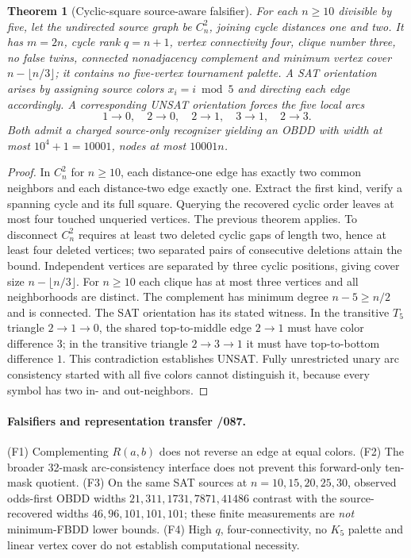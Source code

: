 \documentclass[11pt]{article}
\newtheorem{theorem}{Theorem}
\begin{document}
\begin{theorem}[Cyclic-square source-aware falsifier]
For each $n\ge10$ divisible by five, let the undirected source
graph be $C_n^2$, joining cycle distances one and two. It has
$m=2n$, cycle rank $q=n+1$, vertex connectivity four, clique number
three, no false twins, connected nonadjacency complement and minimum
vertex cover $n-\lfloor n/3\rfloor$; it contains no five-vertex
tournament palette. A SAT orientation arises by assigning source
colors $x_i=i\bmod5$ and directing each edge accordingly. A
corresponding UNSAT orientation forces the five local arcs
\[
1\to0,\quad2\to0,\quad2\to1,\quad3\to1,\quad2\to3.
\]
Both admit a charged source-only recognizer yielding an OBDD with
width at most $10^4+1=10001$, nodes at most $10001n$.
\end{theorem}
\begin{proof}
In $C_n^2$ for $n\ge10$, each distance-one edge has exactly two
common neighbors and each distance-two edge exactly one. Extract
the first kind, verify a spanning cycle and its full square.
Querying the recovered cyclic order leaves at most four touched
unqueried vertices. The previous theorem applies.
To disconnect $C_n^2$ requires at least two deleted cyclic gaps
of length two, hence at least four deleted vertices; two separated
pairs of consecutive deletions attain the bound. Independent vertices are separated by
three cyclic positions, giving cover size $n-\lfloor n/3\rfloor$.
For $n\ge10$ each clique has at most three vertices and all
neighborhoods are distinct. The complement has minimum degree
$n-5\ge n/2$ and is connected.
The SAT orientation has its stated witness. In the transitive
$T_5$ triangle $2\to1\to0$, the shared top-to-middle edge $2\to1$
must have color difference $3$; in the transitive triangle
$2\to3\to1$ it must have top-to-bottom difference $1$.
This contradiction establishes UNSAT. Fully unrestricted unary
arc consistency started with all five colors cannot distinguish
it, because every symbol has two in- and out-neighbors.
\end{proof}

\paragraph{Falsifiers and representation transfer /087.}
(F1) Complementing $R(a,b)$ does not reverse an edge at equal
colors. (F2) The broader 32-mask arc-consistency interface does
not prevent this forward-only ten-mask quotient. (F3) On the same
SAT sources at $n=10,15,20,25,30$, observed odds-first
OBDD widths $21,311,1731,7871,41486$ contrast with the
source-recovered widths $46,96,101,101,101$; these finite measurements
are \emph{not} minimum-FBDD lower bounds. (F4) High $q$,
four-connectivity, no $K_5$ palette and linear vertex cover
do not establish computational necessity.
\end{document}
